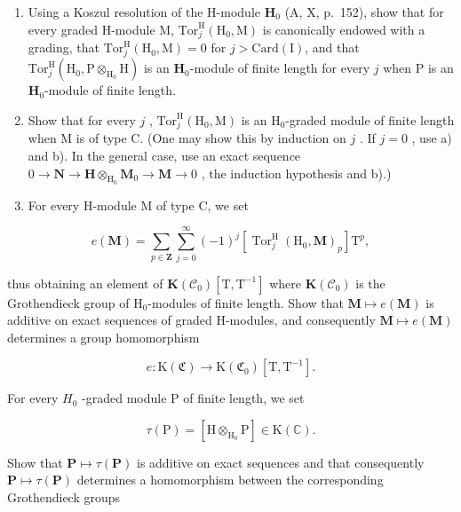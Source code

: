\begin{enumerate}
\def\labelenumi{\alph{enumi})}
\setcounter{enumi}{1}
\item
  Using a Koszul resolution of the H-module \(\mathbf{H}_0\) (A, X, p.~152), show that for every graded H-module M, \(\mathrm{Tor}_j^{\mathrm{H}}(\mathrm{H}_0,\mathrm{M})\) is canonically endowed with a grading, that \(\mathrm{Tor}_j^{\mathrm{H}}(\mathrm{H}_0,\mathrm{M}) = 0\) for \(j > \mathrm{Card}(\mathrm{I})\), and that \(\mathrm{Tor}_j^{\mathrm{H}}(\mathrm{H}_0,\mathrm{P}\otimes_{\mathrm{H}_0}\mathrm{H})\) is an \(\mathbf{H}_0\)-module of finite length for every \(j\) when P is an \(\mathbf{H}_0\)-module of finite length.
\item
  Show that for every \(j\) , \(\mathrm{Tor}_{j}^{\mathrm{H}}(\mathrm{H}_{0}, \mathrm{M})\) is an \(\mathrm{H}_{0}\)-graded module of finite length when M is of type C. (One may show this by induction on \(j\) . If \(j = 0\) , use a) and b). In the general case, use an exact sequence \(0 \to \mathbf{N} \to \mathbf{H} \otimes_{\mathrm{H}_{0}} \mathbf{M}_{0} \to \mathbf{M} \to 0\) , the induction hypothesis and b).)
\item
  For every H-module M of type C, we set
\end{enumerate}

\[
e (\mathbf {M}) = \sum_ {p \in \mathbf {Z}} \sum_ {j = 0} ^ {\infty} (- 1) ^ {j} [ \operatorname{Tor} _ {j} ^ {\mathrm{H}} (\mathrm{H} _ {0}, \mathbf {M}) _ {p} ] \mathrm{T} ^ {p},
\]

  thus obtaining an element of \(\mathbf{K}(\mathcal{C}_{0})[\mathrm{T},\mathrm{T}^{-1}]\) where \(\mathbf{K}(\mathcal{C}_{0})\) is the Grothendieck group of \(\mathrm{H}_{0}\)-modules of finite length. Show that \(\mathbf{M}\mapsto e(\mathbf{M})\) is additive on exact sequences of graded H-modules, and consequently \(\mathbf{M}\mapsto e(\mathbf{M})\) determines a group homomorphism

\[
e: \mathrm{K} (\mathfrak {C}) \to \mathrm{K} (\mathfrak {C} _ {0}) [ \mathrm{T}, \mathrm{T} ^ {- 1} ].
\]

For every \(H_{0}\) -graded module P of finite length, we set

\[
\tau (\mathrm{P}) = [ \mathrm{H} \otimes_ {\mathrm{H} _ {0}} \mathrm{P} ] \in \mathrm{K} (\mathbb {C}).
\]

Show that \(\mathbf{P} \mapsto \tau(\mathbf{P})\) is additive on exact sequences and that consequently \(\mathbf{P} \mapsto \tau(\mathbf{P})\) determines a homomorphism between the corresponding Grothendieck groups

